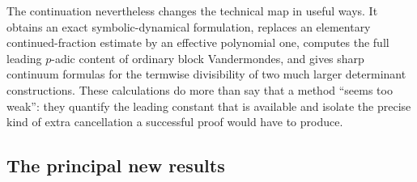 \documentclass[11pt,oneside]{article}
\theoremstyle{definition}
\theoremstyle{remark}
\begin{document}
The continuation nevertheless changes the technical map in useful ways.  It obtains an exact
symbolic-dynamical formulation, replaces an elementary continued-fraction estimate by an
effective polynomial one, computes the full leading $p$-adic content of ordinary block
Vandermondes, and gives sharp continuum formulas for the termwise divisibility of two much
larger determinant constructions.  These calculations do more than say that a method ``seems
too weak'': they quantify the leading constant that is available and isolate the precise
kind of extra cancellation a successful proof would have to produce.

\subsection{The principal new results}
\end{document}
